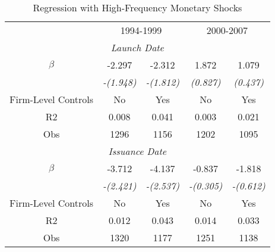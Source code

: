 \documentclass[11pt]{article}
\begin{document}
\begin{table}[htbp]
	\centering
	\caption{Regression with High-Frequency Monetary Shocks}
	\begin{tabular}{ccccc}
		\toprule
		& \multicolumn{2}{c}{1994-1999} & \multicolumn{2}{c}{2000-2007} \\
		\multicolumn{5}{c}{\textit{Launch Date}} \\
		$ \beta $ & -2.297 & -2.312 & 1.872 & 1.079 \\
		& \textit{-(1.948)} & \textit{-(1.812)} & \textit{(0.827)} & \textit{(0.437)} \\
		\midrule
		Firm-Level Controls & No    & Yes   & No    & Yes \\
		R2    & 0.008 & 0.041 & 0.003 & 0.021 \\
		Obs   & 1296  & 1156  & 1202  & 1095\\
		\midrule
		\multicolumn{5}{c}{\textit{Issuance Date}}\\
		$ \beta $ & -3.712 & -4.137 & -0.837 & -1.818 \\
		& \textit{-(2.421)} & \textit{-(2.537)} & \textit{-(0.305)} & \textit{-(0.612)} \\
		\midrule
		Firm-Level Controls & No    & Yes   & No    & Yes \\
		R2    & 0.012 & 0.043 & 0.014 & 0.033 \\
		Obs   & 1320  & 1177  & 1251  & 1138 \\
		\bottomrule
	\end{tabular}%
	\label{tab:addlabel}%
\end{table}%
\end{document}
